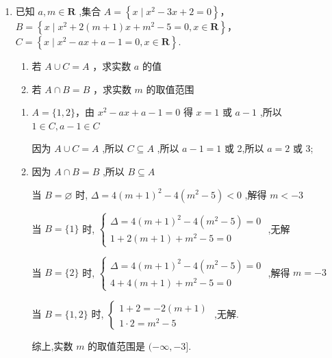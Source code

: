 \begin{enumerate}
    \item 已知 $a,m \in  \mathbf{R}$ ,集合 $A = \left\{  {x \mid  {x}^{2} - {3x} + 2 = 0}\right\} $，$B = \left\{  {x \mid  {x}^{2} + 2\left( {m + 1}\right) x + {m}^{2} - 5 = 0,x \in  \mathbf{R}}\right\} $，$C =  \left\{  {x \mid  {x}^{2} - {ax} + a - 1 = 0,x \in  \mathbf{R}}\right\} .$
    \begin{enumerate}
        \item 若 $A \cup  C = A$ ，求实数 $a$ 的值
        \item 若 $A \cap  B = B$ ，求实数 $m$ 的取值范围
    \end{enumerate}
    \begin{jieda}
        \begin{enumerate}
            \item $A = \{ 1,2\}$，由 ${x}^{2} - {ax} + a - 1 = 0$ 得 $x = 1$ 或 $a - 1$ ,所以 $1 \in  C,a - 1 \in  C$
            
            因为 $A \cup  C = A$ ,所以 $C \subseteq  A$ ,所以 $a - 1 = 1$ 或 2,所以 $a = 2$ 或 3;
            \item 因为 $A \cap  B = B$ ,所以 $B \subseteq  A$
            
            当 $B = \varnothing$ 时, $\Delta  = 4{\left( m + 1\right) }^{2} - 4\left( {{m}^{2} - 5}\right)  < 0$ ,解得 $m <  - 3$
            
            当 $B = \{ 1\}$ 时, $\left\{  \begin{array}{l} \Delta  = 4{\left( m + 1\right) }^{2} - 4\left( {{m}^{2} - 5}\right)  = 0 \\  1 + 2\left( {m + 1}\right)  + {m}^{2} - 5 = 0 \end{array}\right.$ ,无解
            
            当 $B = \{ 2\}$ 时, $\left\{  \begin{array}{l} \Delta  = 4{\left( m + 1\right) }^{2} - 4\left( {{m}^{2} - 5}\right)  = 0 \\  4 + 4\left( {m + 1}\right)  + {m}^{2} - 5 = 0 \end{array}\right.$ ,解得 $m =  - 3$
            
            当 $B = \{ 1,2\}$ 时, $\left\{  \begin{array}{l} 1 + 2 =  - 2\left( {m + 1}\right) \\  1 \cdot  2 = {m}^{2} - 5 \end{array}\right.$ ,无解.
            
            综上,实数 $m$ 的取值范围是 $( - \infty , - 3\rbrack$.
        \end{enumerate}
    \end{jieda}
    

\end{enumerate}
